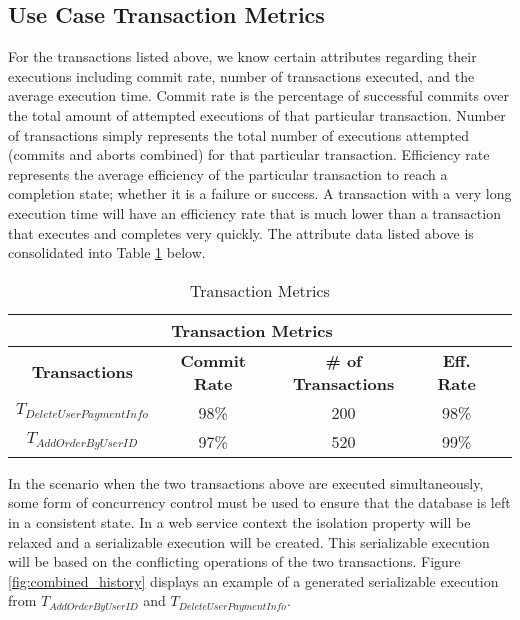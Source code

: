 \documentclass[conference]{IEEEtran}
\begin{document}
\subsection{Use Case Transaction Metrics}

For the transactions listed above, we know certain attributes regarding their executions including commit rate, number of transactions executed, and the average execution time. Commit rate is the percentage of successful commits over the total amount of attempted executions of that particular transaction. Number of transactions simply represents the total number of executions attempted (commits and aborts combined) for that particular transaction. Efficiency rate represents the average efficiency of the particular transaction to reach a completion state; whether it is a failure or success. A transaction with a very long execution time will have an efficiency rate that is much lower than a transaction that executes and completes very quickly. The attribute data listed above is consolidated into Table \ref{tbl:trans_metrics} below. 
\\
\begin{table}[h]
\captionsetup{justification=centering}
\centering
\begin{tabular}{|c|c|c|c|c|}
\hline
\multicolumn{4}{|c|}{\cellcolor[HTML]{EFEFEF}\textbf{Transaction Metrics}}                                                   \\ \hline
\textbf{Transactions} & \textbf{Commit Rate} & \textbf{\# of Transactions} & {\color[HTML]{000000} \textbf{Eff. Rate}} \\ \hline
$T_{DeleteUserPaymentInfo}$         & 98\%                  & 200                         & 98\%                                          \\ \hline
$T_{AddOrderByUserID}$          & 97\%                     & 520                           & 99\%                                              \\ \hline
\end{tabular}

\caption{Transaction Metrics} %
\label{tbl:trans_metrics} %

\end{table}

In the scenario when the two transactions above are executed simultaneously, some form of concurrency control must be used to ensure that the database is left in a consistent state. In a web service context the isolation property will be relaxed and a serializable execution will be created. This serializable execution will be based on the conflicting operations of the two transactions. Figure \ref{fig:combined_history} displays an example of a generated serializable execution from $T_{AddOrderByUserID}$ and $T_{DeleteUserPaymentInfo}$.
\end{document}
